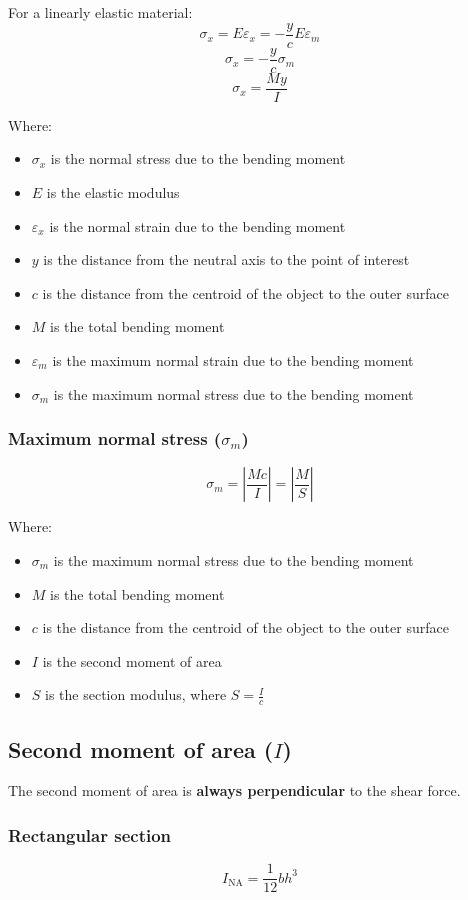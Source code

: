\documentclass[11pt]{article}
\begin{document}
For a linearly elastic material:
\[\sigma_x = E \varepsilon_x = - \frac{y}{c} E \varepsilon_m\]
\[\sigma_x = - \frac{y}{c} \sigma_m\]
\[\sigma_x = \frac{My}{I}\]

Where:
\begin{itemize}
\item \(\sigma_x\) is the normal stress due to the bending moment
\item \(E\) is the elastic modulus
\item \(\varepsilon_x\) is the normal strain due to the bending moment
\item \(y\) is the distance from the neutral axis to the point of interest
\item \(c\) is the distance from the centroid of the object to the outer surface
\item \(M\) is the total bending moment
\item \(\varepsilon_m\) is the maximum normal strain due to the bending moment
\item \(\sigma_m\) is the maximum normal stress due to the bending moment
\end{itemize}

\newpage
\subsubsection{Maximum normal stress (\(\sigma_m\))}
\label{sec:org960e45f}
\[\sigma_m = \left| \frac{Mc}{I} \right| = \left| \frac{M}{S} \right|\]

Where:
\begin{itemize}
\item \(\sigma_m\) is the maximum normal stress due to the bending moment
\item \(M\) is the total bending moment
\item \(c\) is the distance from the centroid of the object to the outer surface
\item \(I\) is the second moment of area
\item \(S\) is the section modulus, where \(S = \frac{I}{c}\)
\end{itemize}
\subsection{Second moment of area (\(I\))}
\label{sec:orgd7a8d34}
The second moment of area is \textbf{always perpendicular} to the shear force.
\subsubsection{Rectangular section}
\label{sec:org654c0bb}
\[I_{\text{NA}} = \frac{1}{12} bh^3\]
\end{document}
